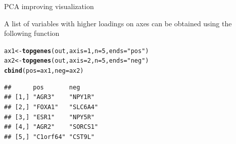 \documentclass[10pt,xcolor=dvipsnames]{beamer}\usepackage[]{graphicx}\usepackage[]{color}
\makeatletter
\newcommand{\hlnum}[1]{\textcolor[rgb]{0.686,0.059,0.569}{#1}}%
\newcommand{\hlstr}[1]{\textcolor[rgb]{0.192,0.494,0.8}{#1}}%
\newcommand{\hlopt}[1]{\textcolor[rgb]{0,0,0}{#1}}%
\newcommand{\hlstd}[1]{\textcolor[rgb]{0.345,0.345,0.345}{#1}}%
\newcommand{\hlkwb}[1]{\textcolor[rgb]{0.69,0.353,0.396}{#1}}%
\newcommand{\hlkwc}[1]{\textcolor[rgb]{0.333,0.667,0.333}{#1}}%
\newcommand{\hlkwd}[1]{\textcolor[rgb]{0.737,0.353,0.396}{\textbf{#1}}}%
\newenvironment{kframe}{%
 \def\at@end@of@kframe{}%
 \ifinner\ifhmode%
  \def\at@end@of@kframe{\end{minipage}}%
  \begin{minipage}{\columnwidth}%
 \fi\fi%
 \def\FrameCommand##1{\hskip\@totalleftmargin \hskip-\fboxsep
 \colorbox{shadecolor}{##1}\hskip-\fboxsep
     \hskip-\linewidth \hskip-\@totalleftmargin \hskip\columnwidth}%
 \MakeFramed {\advance\hsize-\width
   \@totalleftmargin\z@ \linewidth\hsize
   \@setminipage}}%
 {\par\unskip\endMakeFramed%
 \at@end@of@kframe}
\newenvironment{knitrout}{}{} %
\makeatother
\begin{document}

\begin{frame}{PCA improving visualization}

A list of variables with higher loadings on axes can be obtained using the following
function

\begin{knitrout}\footnotesize
{}\color{fgcolor}\begin{kframe}
\begin{alltt}
\hlstd{ax1} \hlkwb{<-} \hlkwd{topgenes}\hlstd{(out,} \hlkwc{axis}\hlstd{=}\hlnum{1}\hlstd{,} \hlkwc{n}\hlstd{=}\hlnum{5}\hlstd{,} \hlkwc{ends}\hlstd{=}\hlstr{"pos"}\hlstd{)}
\hlstd{ax2} \hlkwb{<-} \hlkwd{topgenes}\hlstd{(out,} \hlkwc{axis}\hlstd{=}\hlnum{2}\hlstd{,} \hlkwc{n}\hlstd{=}\hlnum{5}\hlstd{,} \hlkwc{ends}\hlstd{=}\hlstr{"neg"}\hlstd{)}
\hlkwd{cbind}\hlstd{(}\hlkwc{pos}\hlstd{=ax1,} \hlkwc{neg}\hlstd{=ax2)}
\end{alltt}
\begin{verbatim}
##      pos       neg     
## [1,] "AGR3"    "NPY1R" 
## [2,] "FOXA1"   "SLC6A4"
## [3,] "ESR1"    "NPY5R" 
## [4,] "AGR2"    "SORCS1"
## [5,] "C1orf64" "CST9L"
\end{verbatim}
\end{kframe}
\end{knitrout}

\end{frame}
\end{document}
